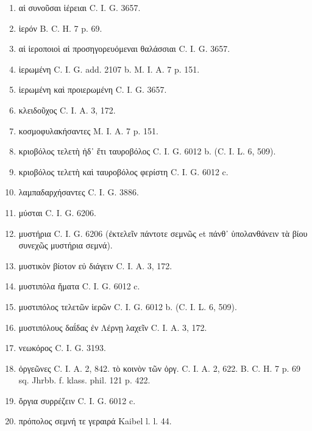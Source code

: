 \documentclass[a4paper, 11pt, oneside, polutonikogreek, german]{article}
\begin{document}
\begin{enumerate}
\item αἱ συνοῦσαι ἱέρειαι C. I. G. 3657.

\item ἱερόν B. C. H. 7 p. 69.

\item αἱ ἱεροποιοὶ αἱ προσηγορευόμεναι θαλάσσιαι C. I. G. 3657.

\item ἱερωμένη C. I. G. add. 2107 b. M. I. A. 7 p. 151.

\item ἱερωμένη καὶ προιερωμένη C. I. G. 3657.

\item κλειδοῦχος C. I. A. 3, 172.

\item κοσμοφυλακήσαντες M. I. A. 7 p. 151.

\item κριοβόλος τελετὴ ἠδ᾽ ἔτι ταυροβόλος C. I. G. 6012 b. (C. I. L. 6, 509).

\item κριοβόλος τελετὴ καὶ ταυροβόλος φερίστη C. I. G. 6012 c.

\item λαμπαδαρχήσαντες C. I. G. 3886.

\item μύσται C. I. G. 6206.

\item μυστήρια C. I. G. 6206 (ἐκτελεῖν πάντοτε σεμνῶς et πάνθ᾽ ὑπολανθάνειν τὰ βίου συνεχῶς μυστήρια σεμνά).

\item μυστικὸν βίοτον εὐ διάγειν C. I. A. 3, 172.

\item μυστιπόλα ἤματα C. I. G. 6012 c.

\item μυστιπόλος τελετῶν ἱερῶν C. I. G. 6012 b. (C. I. L. 6, 509).

\item μυστιπόλους δαΐδας ἐν Λέρνῃ λαχεῖν C. I. A. 3, 172.

\item νεωκόρος C. I. G. 3193.

\item ὀργεῶνες C. I. A. 2, 842. τὸ κοινὸν τῶν ὀργ. C. I. A. 2, 622. B. C. H. 7 p. 69 sq. Jhrbb. f. klass. phil. 121 p. 422.

\item ὄργια συρρέζειν C. I. G. 6012 c.

\item πρόπολος σεμνή τε γεραιρά Kaibel l. l. 44.


\end{enumerate}
\end{document}

